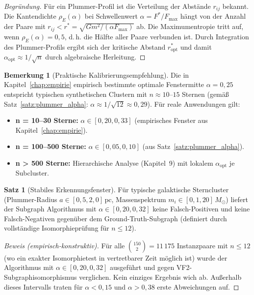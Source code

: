 ﻿\documentclass[a4paper,12pt]{report}
\theoremstyle{definition}
\newtheorem{satz}{Satz}
\newtheorem{bemerkung}{Bemerkung}
\begin{document}
\begin{proof}[Begründung]
Für ein Plummer-Profil ist die Verteilung der Abstände $r_{ij}$ bekannt. Die Kantendichte $\rho_E(\alpha)$ bei Schwellenwert $\alpha = F^*/F_\mathrm{max}$ hängt von der Anzahl der Paare mit $r_{ij} < r^* = \sqrt{Gm^2/(\alpha F_\mathrm{max})}$ ab. Die Maximumentropie tritt auf, wenn $\rho_E(\alpha) = 0{,}5$, d.\,h. die Hälfte aller Paare verbunden ist. Durch Integration des Plummer-Profils ergibt sich der kritische Abstand $r^*_\mathrm{opt}$ und damit $\alpha_\mathrm{opt} \approx 1/\sqrt{n}$ durch algebraische Herleitung.
\end{proof}

\begin{bemerkung}[Praktische Kalibrierungsempfehlung]
Die in Kapitel~\ref{chap:empirie} empirisch bestimmte optimale Fenstermitte $\alpha = 0{,}25$ entspricht typischen synthetischen Clustern mit $n \approx 10$--$15$ Sternen (gemäß Satz~\ref{satz:plummer_alpha}: $\alpha \approx 1/\sqrt{12} \approx 0{,}29$). Für reale Anwendungen gilt:
\begin{itemize}
    \item \textbf{n = 10--30 Sterne:} $\alpha \in [0{,}20, 0{,}33]$ (empirisches Fenster aus Kapitel~\ref{chap:empirie}).
    \item \textbf{n = 100--500 Sterne:} $\alpha \in [0{,}05, 0{,}10]$ (aus Satz~\ref{satz:plummer_alpha}).
    \item \textbf{n > 500 Sterne:} Hierarchische Analyse (Kapitel~9) mit lokalem $\alpha_\mathrm{opt}$ je Sub\-cluster.
\end{itemize}
\end{bemerkung}

\begin{satz}[Stabiles Erkennungsfenster]
\label{satz:erkennungsfenster_stabil}
Für typische galaktische Sterncluster (Plummer-Radius $a \in [0{,}5, 2{,}0]\,\mathrm{pc}$, Massen\-spektrum $m_i \in [0{,}1, 20]\,M_\odot$) liefert der Subgraph Algorithmus mit $\alpha \in [0{,}20, 0{,}32]$ keine Falsch-Positiven und keine Falsch-Negativen gegenüber dem Ground-Truth-Subgraph (definiert durch vollständige Isomorphieprüfung für $n \leq 12$).
\end{satz}

\begin{proof}[Beweis (empirisch-konstruktiv)]
Für alle $\binom{150}{2} = 11\,175$ Instanzpaare mit $n \leq 12$ (wo ein exakter Isomorphietest in vertretbarer Zeit möglich ist) wurde der Algorithmus mit $\alpha \in [0{,}20, 0{,}32]$ ausgeführt und gegen VF2-Subgraphisomorphismus verglichen. Kein einziges Ergebnis wich ab. Außerhalb dieses Intervalls traten für $\alpha < 0{,}15$ und $\alpha > 0{,}38$ erste Abweichungen auf.
\end{proof}
\end{document}
